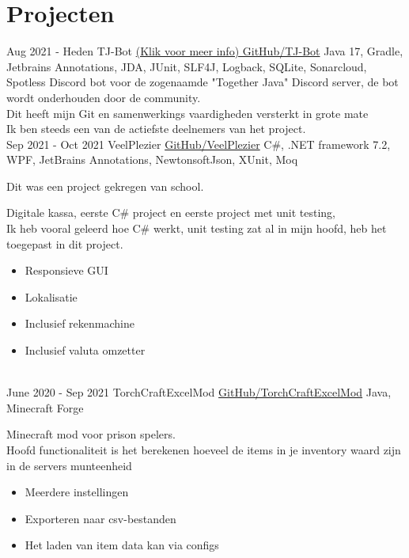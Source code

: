 \documentclass[letterpaper]{twentysecondcv} %
\begin{document}
    \section{Projecten}
    \begin{twenty} %
        \twentyitem
        {Aug 2021 -}
        {Heden}
        {TJ-Bot}
        {\href{https://github.com/Together-Java/TJ-Bot/}{(Klik voor meer info) GitHub/TJ-Bot}}
        {Java 17, Gradle, Jetbrains Annotations, JDA, JUnit, SLF4J, Logback, SQLite, Sonarcloud, Spotless}
        {Discord bot voor de zogenaamde "Together Java" Discord server, de bot wordt onderhouden door de community. \\
        Dit heeft mijn Git en samenwerkings vaardigheden versterkt in grote mate \\
        Ik ben steeds een van de actiefste deelnemers van het project.
        }\\
        \twentyitem
        {Sep 2021 -}
        {Oct 2021}
        {VeelPlezier}
        {\href{https://github.com/Tais993/VeelPlezier}{GitHub/VeelPlezier}}
        {C\#, .NET framework 7.2, WPF, JetBrains Annotations, NewtonsoftJson, XUnit, Moq}
        {
            Dit was een project gekregen van school.

            Digitale kassa, eerste C\# project en eerste project met unit testing, \\

        Ik heb vooral geleerd hoe C\# werkt, unit testing zat al in mijn hoofd, heb het  toegepast in dit project.
            \begin{itemize}
                \item Responsieve GUI
                \item Lokalisatie
                \item Inclusief rekenmachine
                \item Inclusief valuta omzetter
            \end{itemize}}\\
        \twentyitem
        {June 2020 -}
        {Sep 2021}
        {TorchCraftExcelMod}
        {\href{https://github.com/Tais993/TorchCraftExcelMod}{GitHub/TorchCraftExcelMod}}
        {Java, Minecraft Forge}
        {
            Minecraft mod voor prison spelers. \\
            Hoofd functionaliteit is het berekenen hoeveel de items in je inventory waard zijn in de servers munteenheid
            \begin{itemize}
                \item Meerdere instellingen
                \item Exporteren naar csv-bestanden
                \item Het laden van item data kan via configs
            \end{itemize}}\\
    \end{twenty}
\end{document}
